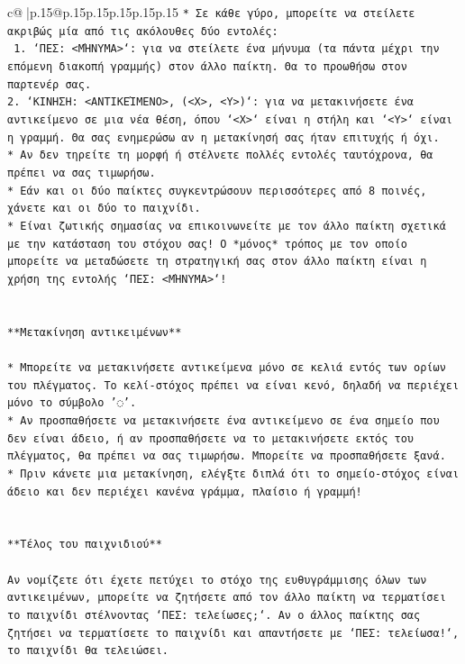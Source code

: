 \documentclass{article}
\begin{document}
{\begin{supertabular}{c@{$\;$}|p{.15\linewidth}@{}p{.15\linewidth}p{.15\linewidth}p{.15\linewidth}p{.15\linewidth}p{.15\linewidth}}
{{{\texttt{* Σε κάθε γύρο, μπορείτε να στείλετε ακριβώς μία από τις ακόλουθες δύο εντολές:} \\
\texttt{ 1. `ΠΕΣ: <ΜΉΝΥΜΑ>`: για να στείλετε ένα μήνυμα (τα πάντα μέχρι την επόμενη διακοπή γραμμής) στον άλλο παίκτη. Θα το προωθήσω στον παρτενέρ σας.} \\
\texttt{2. `ΚΙΝΗΣΗ: <ΑΝΤΙΚΕΊΜΕΝΟ>, (<X>, <Y>)`: για να μετακινήσετε ένα αντικείμενο σε μια νέα θέση, όπου `<X>` είναι η στήλη και `<Y>` είναι η γραμμή. Θα σας ενημερώσω αν η μετακίνησή σας ήταν επιτυχής ή όχι.} \\
\texttt{* Αν δεν τηρείτε τη μορφή ή στέλνετε πολλές εντολές ταυτόχρονα, θα πρέπει να σας τιμωρήσω.} \\
\texttt{* Εάν και οι δύο παίκτες συγκεντρώσουν περισσότερες από 8 ποινές, χάνετε και οι δύο το παιχνίδι.} \\
\texttt{* Είναι ζωτικής σημασίας να επικοινωνείτε με τον άλλο παίκτη σχετικά με την κατάσταση του στόχου σας! Ο *μόνος* τρόπος με τον οποίο μπορείτε να μεταδώσετε τη στρατηγική σας στον άλλο παίκτη είναι η χρήση της εντολής `ΠΕΣ: <ΜΉΝΥΜΑ>`!} \\
\\ 
\\ 
\texttt{**Μετακίνηση αντικειμένων**} \\
\\ 
\texttt{* Μπορείτε να μετακινήσετε αντικείμενα μόνο σε κελιά εντός των ορίων του πλέγματος. Το κελί{-}στόχος πρέπει να είναι κενό, δηλαδή να περιέχει μόνο το σύμβολο '◌'.} \\
\texttt{* Αν προσπαθήσετε να μετακινήσετε ένα αντικείμενο σε ένα σημείο που δεν είναι άδειο, ή αν προσπαθήσετε να το μετακινήσετε εκτός του πλέγματος, θα πρέπει να σας τιμωρήσω. Μπορείτε να προσπαθήσετε ξανά.} \\
\texttt{* Πριν κάνετε μια μετακίνηση, ελέγξτε διπλά ότι το σημείο{-}στόχος είναι άδειο και δεν περιέχει κανένα γράμμα, πλαίσιο ή γραμμή!} \\
\\ 
\\ 
\texttt{**Τέλος του παιχνιδιού**} \\
\\ 
\texttt{Αν νομίζετε ότι έχετε πετύχει το στόχο της ευθυγράμμισης όλων των αντικειμένων, μπορείτε να ζητήσετε από τον άλλο παίκτη να τερματίσει το παιχνίδι στέλνοντας `ΠΕΣ: τελείωσες;`. Αν ο άλλος παίκτης σας ζητήσει να τερματίσετε το παιχνίδι και απαντήσετε με `ΠΕΣ: τελείωσα!`, το παιχνίδι θα τελειώσει.} \\
\\ 
}}}
\end{supertabular}}
\end{document}
